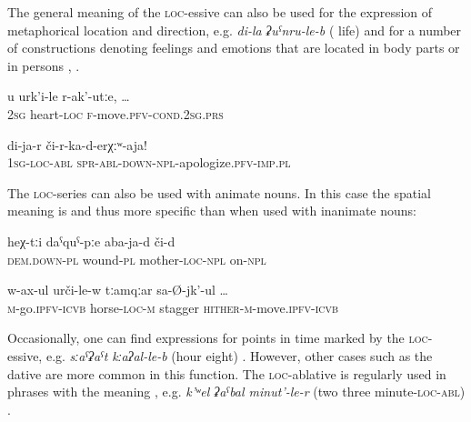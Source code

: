 The general meaning of the \textsc{loc}-essive can also be used for the expression of metaphorical location and direction, e.g. \textit{di-la} \textit{ʡuˁnru-le-b} ( life)  and for a number of constructions denoting feelings and emotions that are located in body parts or in persons , .
%
\begin{exe}
	\ex	\label{ex:when I remember you,}
	\gll	u	urk'i-le	r-ak'-utːe, \ldots\\
		2\textsc{sg}	heart-\textsc{loc}	\textsc{f}-move.\textsc{pfv}-\textsc{cond}.2\textsc{sg}.\textsc{prs}\\
	\glt	{}

	\ex	\label{ex:forgive me}
	\gll	di-ja-r	či-r-ka-d-erχːʷ-aja! \\
		1\textsc{sg}-\textsc{loc}-\textsc{abl}	\textsc{spr}-\textsc{abl-down}-\textsc{npl}-apologize.\textsc{pfv}-\textsc{imp}.\textsc{pl}\\
	\glt	{}
\end{exe}

The \textsc{loc-}series can also be used with animate nouns. In this case the spatial meaning is  and thus more specific than when used with inanimate nouns:

\begin{exe}
	\ex	\label{ex:these wounds on the mother}
	\gll	heχ-tːi	daˁquˁ-pːe	aba-ja-d	či-d \\
		\textsc{dem.down}-\textsc{pl}	wound-\textsc{pl}	mother-\textsc{loc}-\textsc{npl}	on-\textsc{npl}\\
	\glt	{}

	\ex	\label{ex:(he was) riding on a horse and shaking}
	\gll	w-ax-ul	urči-le-w	tːamqːar	sa-Ø-jk'-ul	\ldots\\
		\textsc{m}-go.\textsc{ipfv}-\textsc{icvb}	horse-\textsc{loc}-\textsc{m}	stagger	\textsc{hither}-\textsc{m}-move.\textsc{ipfv}-\textsc{icvb}\\
	\glt	{}
\end{exe}

Occasionally, one can find expressions for points in time marked by the \textsc{loc}-essive, e.g. \textit{sːaˁʡaˁt} \textit{kːaʔal-le-b} (hour eight) . However, other cases such as the dative are more common in this function. The \textsc{loc}-ablative is regularly used in phrases with the meaning , e.g. \textit{k'ʷel ʡaˁbal minut'-le-r} (two three minute-\textsc{loc-abl}) .

